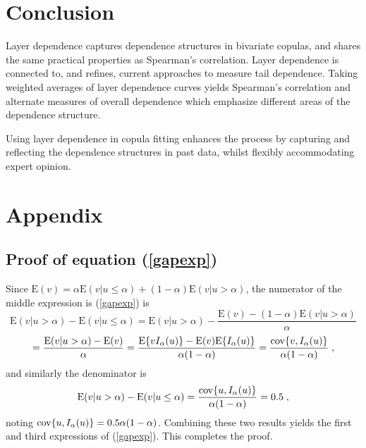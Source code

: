 \documentclass[authoryear]{elsarticle}
\newcommand{\cov}{{\rm cov}}
\newcommand{\E}{{\mathrm E}}
\newcommand{\eref}[1]{(\ref{#1})}
\begin{document}
\section{Conclusion}\label{sconclusion}

Layer dependence captures dependence structures in bivariate copulas, and shares the same practical properties as Spearman's correlation. Layer dependence is connected to, and refines, current approaches to measure tail dependence. Taking weighted averages of layer dependence curves yields Spearman's correlation and alternate measures of overall dependence which emphasize different areas of the dependence structure.

Using layer dependence in copula fitting enhances the process by capturing and reflecting the dependence structures in past data, whilst flexibly accommodating expert opinion. 

\newpage

\newpage

\section{Appendix}


\subsection{Proof of equation \eref{gapexp}}

Since $\E(v)=\alpha\E(v|u\le\alpha)+(1-\alpha)\E(v|u>\alpha)$, the numerator of the middle expression is \eref{gapexp} is
$$
\E(v|u>\alpha)-\E(v|u\leq \alpha) = \E(v|u>\alpha)- \frac{\E(v)-(1-\alpha)\E(v|u>\alpha)}{\alpha}
$$
$$
= \frac{\E(v|u>\alpha)-\E(v)}{\alpha}
= \frac{\E\{vI_\alpha(u)\}-\E(v)\E\{I_\alpha(u)\}}{\alpha(1-\alpha)}
= \frac{\cov\{v,I_\alpha(u)\}}{\alpha(1-\alpha)} \;,
$$
and similarly the denominator is
$$
\E(v|u>\alpha)-\E(v|u\leq \alpha) = \frac{\cov\{u,I_\alpha(u)\}}{\alpha(1-\alpha)} = 0.5 \;,
$$
noting $\cov\{u,I_\alpha(u)\}=0.5\alpha(1-\alpha)$. Combining these two results yields the first and third expressions of \eref{gapexp}. This completes the proof.
\end{document}
